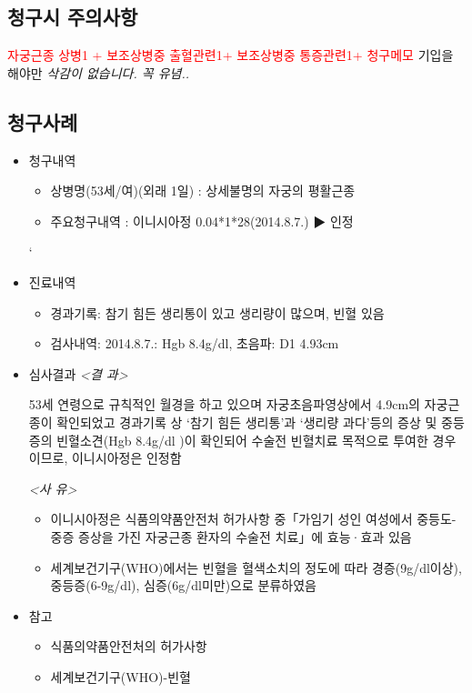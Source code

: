 \subsection{청구시 주의사항}
\textcolor{red}{자궁근종 상병1 + 보조상병중 출혈관련1+ 보조상병중 통증관련1+ 청구메모 }
 기입을 해야만 \emph{삭감이 없습니다. 꼭 유념..}
 
\subsection{청구사례}
\begin{itemize}[■]\tightlist
\item 청구내역
	\begin{itemize}[○]\tightlist
	\item 상병명(53세/여)(외래 1일) : 상세불명의 자궁의 평활근종 
	\item 주요청구내역 : 이니시아정 0.04*1*28(2014.8.7.) ▶ 인정
	\end{itemize}`

\item 진료내역
	\begin{itemize}[○]\tightlist
	\item 경과기록: 참기 힘든 생리통이 있고 생리량이 많으며, 빈혈 있음
	\item 검사내역: 2014.8.7.: Hgb 8.4g/dl, 초음파: D1 4.93cm  
	\end{itemize}		 

\item 심사결과
\emph{ <결  과>}\par 
 53세 연령으로 규칙적인 월경을 하고 있으며 자궁초음파영상에서 4.9cm의  
 자궁근종이 확인되었고 경과기록 상 ‘참기 힘든 생리통’과 ‘생리량 과다’등의 
 증상 및 중등증의 빈혈소견(Hgb 8.4g/dl )이 확인되어 수술전 빈혈치료 목적으로 
 투여한 경우이므로, 이니시아정은 인정함\par

 \emph{ <사  유>}\par 
	\begin{itemize}[○]\tightlist
	\item 이니시아정은 식품의약품안전처 허가사항 중「가임기 성인 여성에서 
    중등도-중증 증상을 가진 자궁근종 환자의 수술전 치료」에 효능·효과 있음
	\item 세계보건기구(WHO)에서는 빈혈을 혈색소치의 정도에 따라 경증(9g/dl이상),
    중등증(6-9g/dl), 심증(6g/dl미만)으로 분류하였음 
	\end{itemize}
\item 참고
	\begin{itemize}[○]\tightlist
	\item 식품의약품안전처의 허가사항 
	\item  세계보건기구(WHO)-빈혈
	\end{itemize}
\end{itemize}
 
